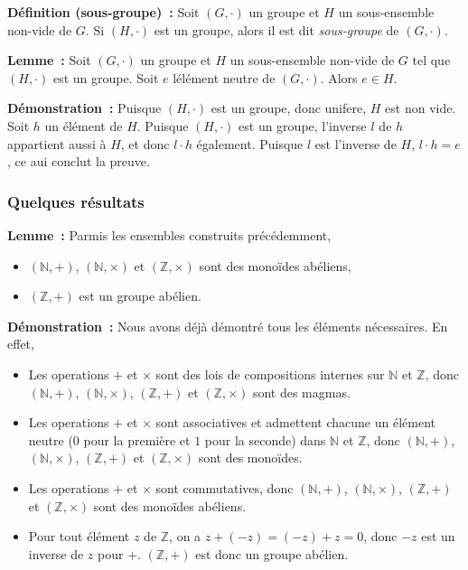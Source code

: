 \medskip

\noindent\textbf{Définition (sous-groupe) :} Soit $(G, \cdot)$ un groupe et $H$ un sous-ensemble non-vide de $G$.
    Si $(H, \cdot)$ est un groupe, alors il est dit \textit{sous-groupe} de $(G, \cdot)$.

\medskip

\noindent\textbf{Lemme :} Soit $(G, \cdot)$ un groupe et $H$ un sous-ensemble non-vide de $G$ tel que $(H, \cdot)$ est un groupe.
    Soit $e$ lélément neutre de $(G, \cdot)$. 
    Alors $e \in H$.

\medskip

\noindent\textbf{Démonstration :} Puisque $(H, \cdot)$ est un groupe, donc unifere, $H$ est non vide. 
    Soit $h$ un élément de $H$. 
    Puisque $(H, \cdot)$ est un groupe, l'inverse $l$ de $h$ appartient aussi à $H$, et donc $l \cdot h$ également. 
    Puisque $l$ est l'inverse de $H$, $l \cdot h = e$, ce aui conclut la preuve.

    \done

\subsubsection{Quelques résultats}

\noindent\textbf{Lemme :} Parmis les ensembles construits précédemment, 
    \begin{itemize}[nosep]
        \item $(\mathbb{N},+)$, $(\mathbb{N},\times)$ et $(\mathbb{Z},\times)$ sont des monoïdes abéliens,
        \item $(\mathbb{Z},+)$ est un groupe abélien.
    \end{itemize}

\medskip

\noindent\textbf{Démonstration :} Nous avons déjà démontré tous les éléments nécessaires. 
    En effet, 
    \begin{itemize}[nosep]
        \item Les operations $+$ et $\times$ sont des lois de compositions internes sur $\mathbb{N}$ et $\mathbb{Z}$, donc $(\mathbb{N},+)$, $(\mathbb{N},\times)$, $(\mathbb{Z},+)$ et $(\mathbb{Z},\times)$ sont des magmas.
        \item Les operations $+$ et $\times$ sont associatives et admettent chacune un élément neutre ($0$ pour la première et $1$ pour la seconde) dans $\mathbb{N}$ et $\mathbb{Z}$, donc $(\mathbb{N},+)$, $(\mathbb{N},\times)$, $(\mathbb{Z},+)$ et $(\mathbb{Z},\times)$ sont des monoïdes.
        \item Les operations $+$ et $\times$ sont commutatives, donc $(\mathbb{N},+)$, $(\mathbb{N},\times)$, $(\mathbb{Z},+)$ et $(\mathbb{Z},\times)$ sont des monoïdes abéliens.
        \item Pour tout élément $z$ de $\mathbb{Z}$, on a $z + (-z) = (-z) + z = 0$, donc $-z$ est un inverse de $z$ pour $+$. 
            $(\mathbb{Z},+)$ est donc un groupe abélien.
    \end{itemize}

